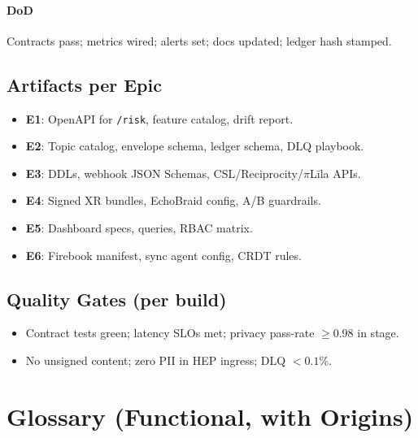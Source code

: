 \documentclass[11pt]{article}
\theoremstyle{plain}
\begin{document}
\paragraph{DoD}
Contracts pass; metrics wired; alerts set; docs updated; ledger hash stamped.

\subsection{Artifacts per Epic}
\begin{itemize}
  \item \textbf{E1}: OpenAPI for \texttt{/risk}, feature catalog, drift report.
  \item \textbf{E2}: Topic catalog, envelope schema, ledger schema, DLQ playbook.
  \item \textbf{E3}: DDLs, webhook JSON Schemas, CSL/Reciprocity/$\pi$Līla APIs.
  \item \textbf{E4}: Signed XR bundles, EchoBraid config, A/B guardrails.
  \item \textbf{E5}: Dashboard specs, queries, RBAC matrix.
  \item \textbf{E6}: Firebook manifest, sync agent config, CRDT rules.
\end{itemize}

\subsection{Quality Gates (per build)}
\begin{itemize}
  \item Contract tests green; latency SLOs met; privacy pass-rate $\ge 0.98$ in stage.
  \item No unsigned content; zero PII in HEP ingress; DLQ $<0.1\%$.
\end{itemize}

\section{Glossary (Functional, with Origins)}
\end{document}
